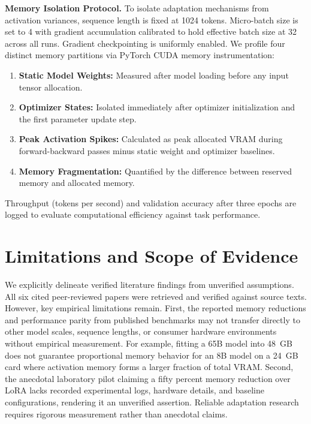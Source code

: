 \documentclass[11pt,a4paper]{article}
\begin{document}
\textbf{Memory Isolation Protocol.} To isolate adaptation mechanisms from activation variances, sequence length is fixed at 1024 tokens. Micro-batch size is set to 4 with gradient accumulation calibrated to hold effective batch size at 32 across all runs. Gradient checkpointing is uniformly enabled. We profile four distinct memory partitions via PyTorch CUDA memory instrumentation:
\begin{enumerate}
    \item \textbf{Static Model Weights:} Measured after model loading before any input tensor allocation.
    \item \textbf{Optimizer States:} Isolated immediately after optimizer initialization and the first parameter update step.
    \item \textbf{Peak Activation Spikes:} Calculated as peak allocated VRAM during forward-backward passes minus static weight and optimizer baselines.
    \item \textbf{Memory Fragmentation:} Quantified by the difference between reserved memory and allocated memory.
\end{enumerate}
Throughput (tokens per second) and validation accuracy after three epochs are logged to evaluate computational efficiency against task performance.

\section{Limitations and Scope of Evidence}

We explicitly delineate verified literature findings from unverified assumptions. All six cited peer-reviewed papers were retrieved and verified against source texts. However, key empirical limitations remain. First, the reported memory reductions and performance parity from published benchmarks may not transfer directly to other model scales, sequence lengths, or consumer hardware environments without empirical measurement. For example, fitting a 65B model into 48~GB does not guarantee proportional memory behavior for an 8B model on a 24~GB card where activation memory forms a larger fraction of total VRAM. Second, the anecdotal laboratory pilot claiming a fifty percent memory reduction over LoRA lacks recorded experimental logs, hardware details, and baseline configurations, rendering it an unverified assertion. Reliable adaptation research requires rigorous measurement rather than anecdotal claims.



\end{document}
